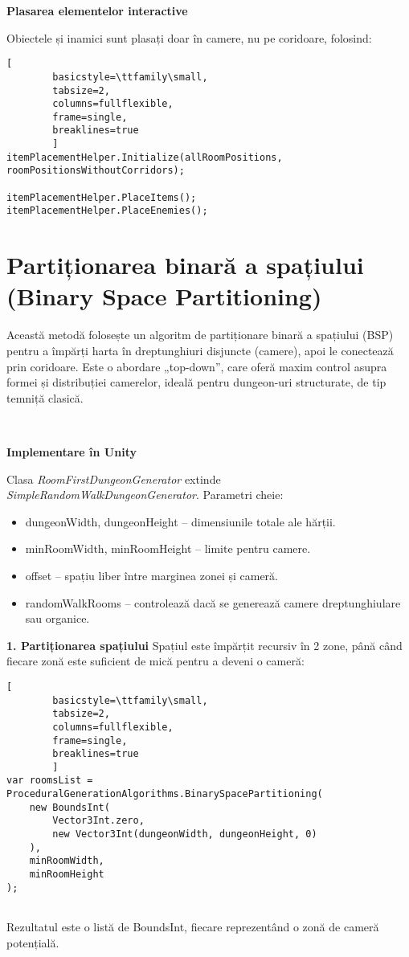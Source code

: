 \documentclass{article}
\begin{document}
	\textbf{Plasarea elementelor interactive}
	
	Obiectele și inamici sunt plasați doar în camere, nu pe coridoare, folosind:
	\lstset{style=sharpc}	
	\begin{lstlisting}[
		basicstyle=\ttfamily\small, 
		tabsize=2, 
		columns=fullflexible,
		frame=single,
		breaklines=true
		]
itemPlacementHelper.Initialize(allRoomPositions, roomPositionsWithoutCorridors);

itemPlacementHelper.PlaceItems();
itemPlacementHelper.PlaceEnemies();
	\end{lstlisting}
	
	
	\section{Partiționarea binară a spațiului (Binary Space Partitioning)}
	\tab Această metodă folosește un algoritm de partiționare binară a spațiului (BSP) pentru a împărți harta în dreptunghiuri disjuncte (camere), apoi le conectează prin coridoare. Este o abordare „top-down”, care oferă maxim control asupra formei și distribuției camerelor, ideală pentru dungeon-uri structurate, de tip temniță clasică. \cite{rogue-bsp} \cite{eskerda-bsp}
	
	  \newline
	
	\textbf{Implementare în Unity}
	
	Clasa \textit{RoomFirstDungeonGenerator} extinde \textit{SimpleRandomWalkDungeonGenerator}. Parametri cheie:
	\begin{itemize}
		\item dungeonWidth, dungeonHeight – dimensiunile totale ale hărții.
		\item minRoomWidth, minRoomHeight – limite pentru camere.
		\item offset – spațiu liber între marginea zonei și cameră.
		\item randomWalkRooms – controlează dacă se generează camere dreptunghiulare sau organice.
	\end{itemize}
	\newpage
	\textbf{1. Partiționarea spațiului}
	Spațiul este împărțit recursiv în 2 zone, până când fiecare zonă este suficient de mică pentru a deveni o cameră:
		\lstset{style=sharpc}	
	\begin{lstlisting}[
		basicstyle=\ttfamily\small, 
		tabsize=2, 
		columns=fullflexible,
		frame=single,
		breaklines=true
		]
var roomsList = ProceduralGenerationAlgorithms.BinarySpacePartitioning(
	new BoundsInt(
		Vector3Int.zero,
		new Vector3Int(dungeonWidth, dungeonHeight, 0)
	),
	minRoomWidth,
	minRoomHeight
);


	\end{lstlisting}
	\tab Rezultatul este o listă de BoundsInt, fiecare reprezentând o zonă de cameră potențială.
	
\end{document}

